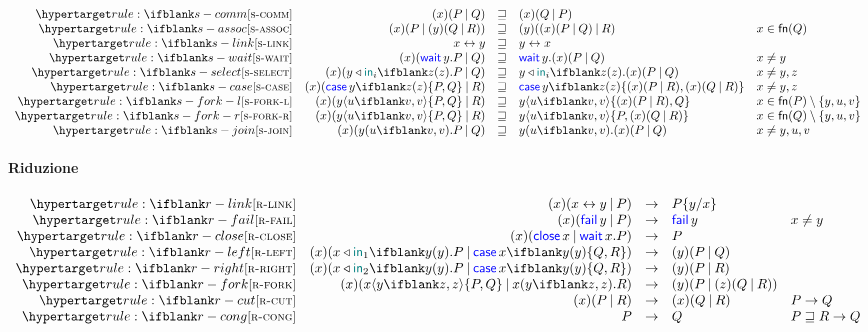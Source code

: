 \documentclass[a4paper]{article}
\begin{document}
\[
    \begin{array}{rrcll}
        \defrule{s-comm} &
        \Cut\x{P}{Q} & \pcong & \Cut\x{Q}{P} \\
        \defrule{s-assoc} &
        \Cut\x{P}{\Cut\y{Q}{R}} & \pcong & \Cut\y{\Cut\x{P}{Q}}{R} & x\in\fn{Q} \\
        \defrule{s-link} &
        \Link\x\y & \pcong & \Link\y\x \\
        \defrule{s-wait} &
        \Cut\x{\Wait\y.P}{Q} & \pcong & \Wait\y.\Cut\x{P}{Q} & x \ne y \\
        \defrule{s-select} &
        \Cut\x{\Select\y{\InTag_i}\z.P}{Q} & \pcong & \Select\y{\InTag_i}\z.\Cut\x{P}{Q} & x \ne y,z \\
        \defrule{s-case} &
        \Cut\x{\Case\y\z{P}{Q}}{R} & \pcong & \Case\y\z{\Cut\x{P}{R}}{\Cut\x{Q}{R}} & x \ne y,z \\
        \defrule{s-fork-l} &
        \Cut\x{\Fork\y\u\v{P}{Q}}{R} & \pcong & \Fork\y\u\v{\Cut\x{P}{R}}{Q} & x \in \fn{P}\setminus\set{y,u,v} \\
        \defrule{s-fork-r} &
        \Cut\x{\Fork\y\u\v{P}{Q}}{R} & \pcong & \Fork\y\u\v{P}{\Cut\x{Q}{R}} & x \in \fn{Q}\setminus\set{y,u,v} \\
        \defrule{s-join} &
        \Cut\x{\Join\y\u\v.P}{Q} & \pcong & \Join\y\u\v.\Cut\x{P}{Q} & x \ne y,u,v \\
    \end{array}
\]

\paragraph{Riduzione}

\[
    \begin{array}{rrcll}
        \defrule{r-link} &
        \Cut\x{\Link\x\y}{P} & \red & P\subst\y\x \\
        \defrule{r-fail} &
        \Cut\x{\Fail\y}{P} & \red & \Fail\y & x \ne y \\
        \defrule{r-close} &
        \Cut\x{\Close\x}{\Wait\x.P} & \red & P \\
        \defrule{r-left} &
        \Cut\x{\Left\x\y.P}{\Case\x\y{Q}{R}} & \red & \Cut\y{P}{Q} \\
        \defrule{r-right} &
        \Cut\x{\Right\x\y.P}{\Case\x\y{Q}{R}} & \red & \Cut\y{P}{R} \\
        \defrule{r-fork} &
        \Cut\x{\Fork\x\y\z{P}{Q}}{\Join\x\y\z.R} & \red & \Cut\y{P}{\Cut\z{Q}{R}} \\
        \defrule{r-cut} &
        \Cut\x{P}{R} & \red & \Cut\x{Q}{R} & P \red Q \\
        \defrule{r-cong} &
        P & \red & Q & P \pcong R \red Q \\
    \end{array}
\]
\end{document}
